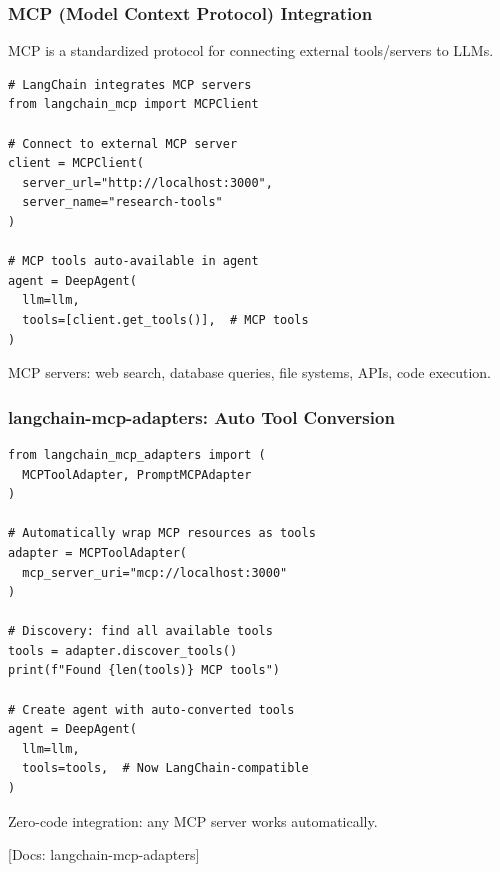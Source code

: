 \documentclass[aspectratio=169,11pt]{beamer}
\newcommand{\docref}[1]{{\scriptsize\color{docgray}[Docs: #1]}}
\begin{document}
\begin{frame}[fragile]
\frametitle{MCP (Model Context Protocol) Integration}

\begin{conceptbox}
MCP is a standardized protocol for connecting external tools/servers to LLMs.
\end{conceptbox}

\vspace{0.8em}
\begin{lstlisting}
# LangChain integrates MCP servers
from langchain_mcp import MCPClient

# Connect to external MCP server
client = MCPClient(
  server_url="http://localhost:3000",
  server_name="research-tools"
)

# MCP tools auto-available in agent
agent = DeepAgent(
  llm=llm,
  tools=[client.get_tools()],  # MCP tools
)
\end{lstlisting}

\begin{tipbox}[Examples]
MCP servers: web search, database queries, file systems, APIs, code execution.
\end{tipbox}

\end{frame}

\begin{frame}[fragile]
\frametitle{langchain-mcp-adapters: Auto Tool Conversion}

\begin{lstlisting}
from langchain_mcp_adapters import (
  MCPToolAdapter, PromptMCPAdapter
)

# Automatically wrap MCP resources as tools
adapter = MCPToolAdapter(
  mcp_server_uri="mcp://localhost:3000"
)

# Discovery: find all available tools
tools = adapter.discover_tools()
print(f"Found {len(tools)} MCP tools")

# Create agent with auto-converted tools
agent = DeepAgent(
  llm=llm,
  tools=tools,  # Now LangChain-compatible
)
\end{lstlisting}

\begin{tipbox}[Benefit]
Zero-code integration: any MCP server works automatically.
\end{tipbox}

\docref{langchain-mcp-adapters}

\end{frame}
\end{document}
